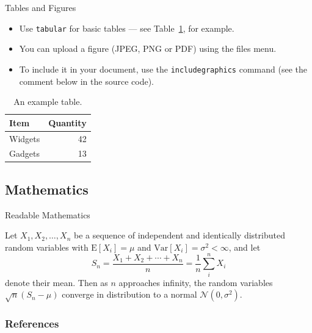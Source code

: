 \documentclass{beamer}
\begin{document}
\begin{frame}{Tables and Figures}

\begin{itemize}
\item Use \texttt{tabular} for basic tables --- see Table~\ref{tab:widgets}, for example.
\item You can upload a figure (JPEG, PNG or PDF) using the files menu. 
\item To include it in your document, use the \texttt{includegraphics} command (see the comment below in the source code).
\end{itemize}


\begin{table}
\centering
\begin{tabular}{l|r}
Item & Quantity \\\hline
Widgets & 42 \\
Gadgets & 13
\end{tabular}
\caption{\label{tab:widgets}An example table.}
\end{table}

\end{frame}

\subsection{Mathematics}

\begin{frame}{Readable Mathematics}

Let $X_1, X_2, \ldots, X_n$ be a sequence of independent and identically distributed random variables with $\text{E}[X_i] = \mu$ and $\text{Var}[X_i] = \sigma^2 < \infty$, and let
\[ S_n = \frac{X_1 + X_2 + \cdots + X_n}{n}
      = \frac{1}{n}\sum_{i}^{n} X_i \]
denote their mean. Then as $n$ approaches infinity, the random variables $\sqrt{n}(S_n - \mu)$ converge in distribution to a normal $\mathcal{N}(0, \sigma^2)$.

\end{frame}

\begin{frame}[t,allowframebreaks]
\frametitle{References}


\end{frame}
\end{document}
